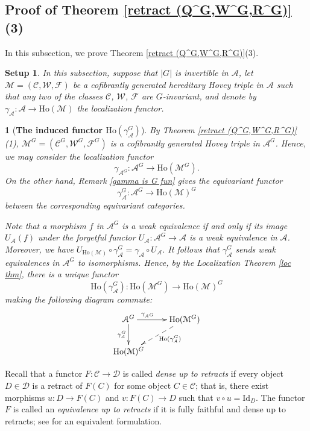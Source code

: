 \documentclass[12pt,twoside]{amsart}
\theoremstyle{bfupright head,slanted body}
\theoremstyle{bfupright head,upright body}
\newtheorem{bfhpg}[res]{}               \newtheorem*{bfhpg*}{}
\theoremstyle{fixed bf head,slanted body}
\theoremstyle{fixed bf head,upright body}
\newtheorem{setup}[res]{Setup}           \newtheorem*{setup*}{Setup}
\theoremstyle{numbered paragraph}
\numberwithin{equation}{res}
\newcommand{\calC}{\mathcal{C}}
\newcommand{\calW}{\mathcal{W}}
\newcommand{\calF}{\mathcal{F}}
\newcommand{\calA}{\mathcal{A}}
\newcommand{\calD}{\mathcal{D}}
\newcommand{\calM}{\mathcal{M}}
\newcommand{\Ho}{\mathrm{Ho}}
\newcommand{\Id}{\mathrm{Id}}
\begin{document}
\subsection{Proof of Theorem \ref{retract (Q^G,W^G,R^G)}(3)} \label{Thm A(2)}
In this subsection, we prove Theorem \ref{retract (Q^G,W^G,R^G)}(3).

\begin{setup}
In this subsection, suppose that $|G|$ is invertible in $\calA$, let $\calM = (\calC, \calW, \calF)$ be a cofibrantly generated hereditary Hovey triple in $\calA$ such that any two of the classes $\calC$, $\calW$, $\calF$ are $G$-invariant, and denote by $\gamma_{\calA} : \calA \to \Ho(\calM)$ the localization functor.
\end{setup}

\begin{bfhpg}[\bf The induced functor $\Ho(\gamma_{\calA}^G)$] \label{exis for Ho^G}
By Theorem \ref{retract (Q^G,W^G,R^G)}(1), $\calM^G = (\calC^G, \calW^G, \calF^G)$ is a cofibrantly generated Hovey triple in $\calA^G$.
Hence, we may consider the localization functor
\[\gamma_{\calA^G} : \calA^G \to \Ho(\calM^G).\]
On the other hand, Remark \ref{gamma is G fun} gives the equivariant functor \[\gamma_{\calA}^G : \calA^G \to \Ho(\calM)^G\] between the corresponding equivariant categories.

Note that a morphism $f$ in $\calA^G$ is a weak equivalence if and only if its image $U_\calA(f)$ under the forgetful functor $U_\calA : \calA^G \to \calA$ is a weak equivalence in $\mathcal{A}$.
Moreover, we have $U_{\Ho(\calM)} \circ \gamma_{\calA}^G = \gamma_{\calA} \circ U_\calA$.
It follows that $\gamma_{\calA}^G$ sends weak equivalences in $\calA^G$ to isomorphisms.
Hence, by the Localization Theorem \ref{loc thm}, there is a unique functor
\[
\Ho(\gamma_{\calA}^G) : \Ho(\calM^G) \to \Ho(\calM)^G
\]
making the following diagram commute:
\[
\xymatrix@R=0.75CM{
   \calA^G
\ar[d]_-{\gamma_{\calA}^G}
\ar[r]^-{\gamma_{\calA^G} \quad}
&  \Ho(\calM^G)
\ar@{-->}[dl]^(0.4){\Ho(\gamma_{\calA}^G)}    \\
   \Ho(\calM)^G                      }
\]
\end{bfhpg}

Recall that a functor \(F:\calC\to\calD\) is called \emph{dense up to retracts} if every object \(D \in \calD\) is a retract of \(F(C)\) for some object \(C\in\calC\); that is, there exist morphisms \(u:D\to F(C)\) and \(v:F(C)\to D\)
such that \(v\circ u=\Id_D\). The functor \(F\) is called an \emph{equivalence up to retracts} if it is fully faithful and dense up to retracts;
see \cite[Lemma 3.4]{2015Chen} for an equivalent formulation.
\end{document}
